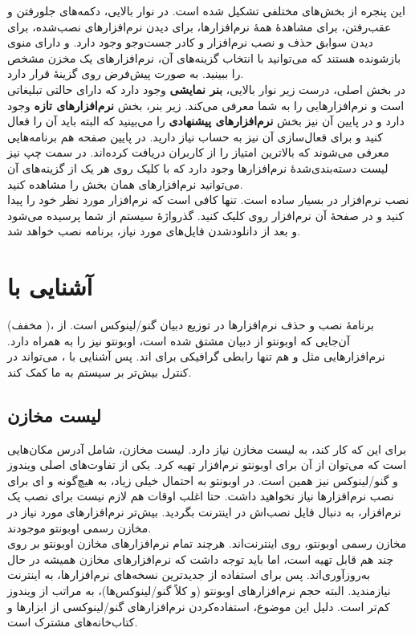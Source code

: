 این پنجره از بخش‌های مختلفی تشکیل شده است. در نوار بالایی، دکمه‌های جلورفتن و عقب‌رفتن،  برای مشاهدهٔ همهٔ نرم‌افزارها،  برای دیدن نرم‌افزارهای نصب‌شده،  برای دیدن سوابق حذف و نصب نرم‌افزار و کادر جست‌وجو وجود دارد.  و  دارای منوی بازشونده هستند که می‌توانید با انتخاب گزینه‌های آن، نرم‌افزارهای یک مخزن مشخص را ببینید.  به صورت پیش‌فرض روی گزینهٔ  قرار دارد.\\
در بخش اصلی، درست زیر نوار بالایی، \textbf{بنر نمایشی} وجود دارد که دارای حالتی تبلیغاتی است و نرم‌افزارهایی را به شما معرفی می‌کند. زیر بنر، بخش \textbf{نرم‌افزارهای تازه} وجود دارد و در پایین آن نیز بخش \textbf{نرم‌افزارهای پیشنهادی} را می‌بینید که البته باید آن را فعال کنید و برای فعال‌سازی آن نیز به حساب  نیاز دارید. در پایین صفحه هم برنامه‌هایی معرفی می‌شوند که بالاترین امتیاز را از کاربران دریافت کرده‌اند. در سمت چپ نیز لیست دسته‌بندی‌شدهٔ نرم‌افزارها وجود دارد که با کلیک روی هر یک از گزینه‌های آن می‌توانید نرم‌افزارهای همان بخش را مشاهده کنید.\\
نصب نرم‌افزار در  بسیار ساده است. تنها کافی است که نرم‌افزار مورد نظر خود را پیدا کنید و در صفحهٔ آن نرم‌افزار روی  کلیک کنید. گذرواژهٔ سیستم از شما پرسیده می‌شود و بعد از دانلودشدن فایل‌های مورد نیاز، برنامه نصب خواهد شد.

\section[آشنایی با Apt]{آشنایی با }
 (مخفف )، برنامهٔ نصب و حذف نرم‌افزارها در توزیع دبیان گنو/لینوکس است. از آن‌جایی که اوبونتو از دبیان مشتق شده است، اوبونتو نیز  را به همراه دارد. نرم‌افزارهایی مثل  و  هم تنها رابطی گرافیکی برای  اند. پس آشنایی با ، می‌تواند در کنترل بیش‌تر بر سیستم به ما کمک کند.

\subsection{لیست مخازن}
برای این که  کار کند، به لیست مخازن نیاز دارد. لیست مخازن، شامل آدرس مکان‌هایی است که می‌توان از آن برای اوبونتو نرم‌افزار تهیه کرد. یکی از تفاوت‌های اصلی ویندوز و گنو/لینوکس نیز همین است. در اوبونتو به احتمال خیلی زیاد، به هیچ‌گونه  و ای برای نصب نرم‌افزارها نیاز نخواهید داشت. حتا اغلب اوقات هم لازم نیست برای نصب یک نرم‌افزار، به دنبال فایل نصب‌اش در اینترنت بگردید. بیش‌تر نرم‌افزارهای مورد نیاز در مخازن رسمی اوبونتو موجودند.\\
مخازن رسمی اوبونتو، روی اینترنت‌اند. هرچند تمام نرم‌افزارهای مخازن اوبونتو بر روی چند  هم قابل تهیه است، اما باید توجه داشت که نرم‌افزارهای مخازن همیشه در حال به‌روزآوری‌اند. پس برای استفاده از جدیدترین نسخه‌های نرم‌افزارها، به اینترنت نیازمندید. البته حجم نرم‌افزارهای اوبونتو (و کلاً گنو/لینوکس‌ها)، به مراتب از ویندوز کم‌تر است. دلیل این موضوع، استفاده‌کردن نرم‌افزارهای گنو/لینوکسی از ابزارها و کتاب‌خانه‌های مشترک است.\\
